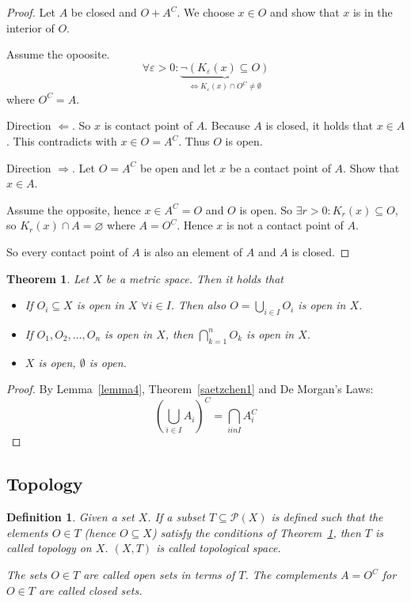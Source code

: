 \documentclass{article}
\newtheorem{theorem}{Theorem}  \numberwithin{theorem}{section}
\newtheorem{definition}{Definition}  \numberwithin{definition}{section}
\begin{document}
\begin{proof}
  Let $A$ be closed and $O + A^C$. We choose $x \in O$ and show that $x$ is in the interior of $O$.

  Assume the opoosite.
  \[ \forall \varepsilon > 0: \underbrace{\neg \left(K_{\varepsilon}(x) \subseteq O\right)}_{\iff K_{\varepsilon}(x) \cap O^C \neq \emptyset} \]
  where $O^C = A$.

  Direction $\Leftarrow$.
  So $x$ is contact point of $A$.
  Because $A$ is closed, it holds that $x \in A$.
  This contradicts with $x \in O = A^C$. Thus $O$ is open.

  Direction $\Rightarrow$.
  Let $O = A^C$ be open and let $x$ be a contact point of $A$. Show that $x \in A$.

  Assume the opposite, hence $x \in A^C = O$ and $O$ is open.
  So $\exists r > 0: K_r(x) \subseteq O$, so $K_r(x) \cap A = \diameter$ where $A = O^C$.
  Hence $x$ is not a contact point of $A$.

  So every contact point of $A$ is also an element of $A$ and $A$ is closed.
\end{proof}

\begin{theorem}
  \label{satz2}
  Let $X$ be a metric space. Then it holds that
  \begin{itemize}
  	\item
  	  If $O_i \subseteq X$ is open in $X$ $\forall i \in I$.
  	  Then also $O = \bigcup_{i \in I} O_i$ is open in $X$.
  	\item
  	  If $O_1, O_2, \dots, O_n$ is open in $X$, then $\bigcap_{k=1}^n O_k$ is open in $X$.
  	\item
  	  $X$ is open, $\emptyset$ is open.
  \end{itemize}
\end{theorem}

\begin{proof}
  By Lemma~\ref{lemma4}, Theorem~\ref{saetzchen1} and De Morgan's Laws:
  \[ \left(\bigcup_{i \in I} A_i\right)^C = \bigcap_{i in I} A_i^C \]
\end{proof}

\subsection{Topology}

\begin{definition}
  Given a set $X$. If a subset $T \subseteq \mathcal P(X)$ is defined
  such that the elements $O \in T$ (hence $O \subseteq X$) satisfy the conditions of Theorem~\ref{satz2},
  then $T$ is called \emph{topology on $X$}.
  $(X, T)$ is called topological space.

  The sets $O \in T$ are called \emph{open sets} in terms of $T$.
  The complements $A = O^C$ for $O \in T$ are called \emph{closed sets}.
\end{definition}
\end{document}
